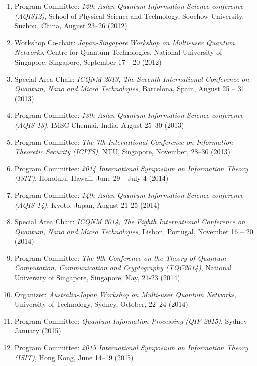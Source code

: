 \begin{enumerate}
\item Program Committee: {\em 12th Asian Quantum Information Science conference (AQIS12)}, 
School of Physical Science and Technology, Soochow University, Suzhou, China, August 23--26 (2012).

\item Workshop Co-chair:
{\em Japan-Singapore Workshop on Multi-user Quantum Networks}, 
Centre for Quantum Technologies, National University of Singapore, Singapore, 
September 17 -- 20 (2012)

\item
Special Area Chair: 
{\em ICQNM 2013, The Seventh International Conference on Quantum, Nano and Micro Technologies}, 
Barcelona, Spain, August 25 -- 31 (2013)

\item
Program Committee: 
{\em 13th Asian Quantum Information Science conference (AQIS 13)}, 
IMSC Chennai, India, August 25--30 (2013)

\item
Program Committee: 
{\em The 7th International Conference on Information Theoretic Security (ICITS)}, NTU, Singapore, November, 28--30 (2013)

\item
Program Committee: 
{\em 2014 International Symposium on Information Theory (ISIT)}, 
Honolulu, Hawaii, June 29 -- July 4 (2014)

\item
Program Committee: 
{\em 14th Asian Quantum Information Science conference (AQIS 14)}, 
Kyoto, Japan, August 21--25  (2014)

\item
Special Area Chair: 
{\em ICQNM 2014, The Eighth International Conference on Quantum, Nano and Micro Technologies}, 
Lisbon, Portugal,
November 16 -- 20 (2014)

\item
Program Committee: 
{\em The 9th Conference on the Theory of Quantum Computation, Communication and
Cryptography (TQC2014)}, 
National University of Singapore, Singapore,
May, 21-23 (2014)

\item
Organizer:
{\em Australia-Japan Workshop on Multi-user Quantum Networks},
University of Technology, Sydney,
October, 22--24 (2014)


\item
Program Committee: 
{\em Quantum Information Processing (QIP 2015)}, 
Sydney January (2015)

\item
Program Committee: 
{\em 2015 International Symposium on Information Theory (ISIT)}, 
Hong Kong, June 14--19  (2015)


\end{enumerate}
